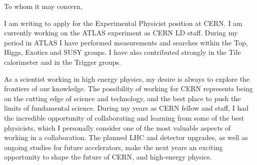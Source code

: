 \documentclass[11pt,a4paper,sans]{moderncv}        %
\begin{document}
\makecvtitle


\vfill
\vfill
\vfill


To whom it may concern,
\newline

I am writing to apply for the Experimental Physicist position at CERN.
I am currently working on the ATLAS experiment as CERN LD staff. During my period in ATLAS I have performed measurements and searches within the Top, Higgs, Exotics and SUSY groups. I have also contributed strongly in the Tile calorimeter and in the Trigger groups. 
\newline

As a scientist working in high energy physics, my desire is always to explore the frontiers of our knowledge. The possibility of working for CERN represents being on the cutting edge of science and technology, and the best place to push the limits of fundamental science.
During my years as CERN fellow and staff, I had the incredible opportunity of collaborating and learning from some of the best physicists, which I personally consider one of the most valuable aspects of working in a collaboration.
The planned LHC and detector upgrades, as well as ongoing studies for future accelerators, make the next years an exciting opportunity to shape the future of CERN, and high-energy physics.
\newline
\end{document}
